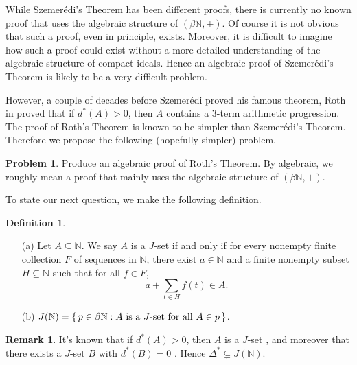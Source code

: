 \documentclass[12pt]{article}
\theoremstyle{plain}
\theoremstyle{definition}
\newtheorem{defn}[thm]{Definition}
\newtheorem{rmk}[thm]{Remark}
\newtheorem{prob}[thm]{Problem}
\newcommand{\bbN}{\mathbb{N}}
\begin{document}
While Szemer\'{e}di's Theorem has been different proofs, there is
currently no known proof that uses the algebraic structure of
$(\beta\bbN,+)$. 
Of course it is not obvious that such a proof, even in principle,
exists.
Moreover, it is difficult to imagine how such a proof could exist
without a more detailed understanding of the algebraic structure of
compact ideals. 
Hence an algebraic proof of Szemer\'{e}di's Theorem is likely to be a
very difficult problem. 

However, a couple of decades before Szemer\'{e}di proved his famous
theorem, Roth in \cite{Roth:1953fk} proved that if $d^*(A) > 0$, then
$A$ contains a 3-term arithmetic progression. 
The proof of Roth's Theorem is known to be simpler than
Szemer\'{e}di's Theorem. 
Therefore we propose the following (hopefully simpler) problem.
\begin{prob}
  Produce an algebraic proof of Roth's Theorem.
  By algebraic, we roughly mean a proof that mainly uses the
  algebraic structure of $(\beta\bbN, +)$. 
\end{prob}

To state our next question, we make the following definition. 
\begin{defn}
  \begin{itemize}
    \item[(a)] Let $A \subseteq \bbN$. 
      We say $A$ is a $J$-set if and only if for every nonempty finite
      collection $F$ of sequences in $\bbN$, there exist $a \in \bbN$
      and a finite nonempty subset $H \subseteq \bbN$ such that for
      all $f \in F$,
      \[
        a + \sum_{t \in H} f(t) \in A.
      \]
    \item[(b)] $J(\bbN) = \{\, p \in \beta\bbN : \hbox{$A$ is a
        $J$-set for all $A \in p$} \,\}$.
  \end{itemize}
\end{defn}
\begin{rmk}
  It's known that if $d^*(A) > 0$, then $A$ is a $J$-set \cite[Theorem
  6.10]{Hindman:2009vn}, and moreover that there exists a $J$-set $B$
  with $d^*(B) = 0$ \cite[Theorem 2.1]{Hindman:2009ys}.
  Hence $\Delta^* \subsetneq J(\bbN)$.   
\end{rmk}
\end{document}
